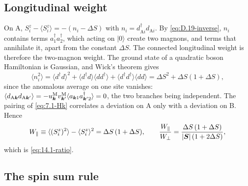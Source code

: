 \subsection*{Longitudinal weight}

On A, $S^z_i - \langle S^z_i\rangle = -(n_i - \Delta S)$ with $n_i = d^\dagger_{\mathrm{A}i}d_{\mathrm{A}i}$. By \cref{eq:D.19-inverse}, $n_i$ contains terms $a^\dagger_1a^\dagger_2$, which acting on $|0\rangle$ create two magnons, and terms that annihilate it, apart from the constant $\Delta S$. The connected longitudinal weight is therefore the two-magnon weight. The ground state of a quadratic boson Hamiltonian is Gaussian, and Wick's theorem gives
\begin{equation*}
  \langle n_i^2\rangle = \langle d^\dagger d\rangle^2 + \langle d^\dagger d\rangle\langle dd^\dagger\rangle + \langle d^\dagger d^\dagger\rangle\langle dd\rangle = \Delta S^2 + \Delta S(1 + \Delta S) ,
\end{equation*}
since the anomalous average on one site vanishes: $\langle d_{\mathrm{A}\bm{k}}d_{\mathrm{A}\bm{k}'}\rangle = -u^{\mathrm{M}}_{\bm{k}}v^{\mathrm{M}}_{\bm{k}'}\langle a_{\bm{k}1}a^\dagger_{\bm{k}'2}\rangle = 0$, the two branches being independent. The pairing of \cref{eq:7.1-Hk} correlates a deviation on A only with a deviation on B. Hence
\begin{equation}
  W_\parallel \equiv \langle(S^z_i)^2\rangle - \langle S^z_i\rangle^2 = \Delta S\,(1 + \Delta S), \qquad
  \frac{W_\parallel}{W_\perp} = \frac{\Delta S\,(1 + \Delta S)}{|\bm{S}|\,(1 + 2\Delta S)} ,
  \label{eq:D.38-Wpar}
\end{equation}
which is \cref{eq:14.1-ratio}.

\subsection*{The spin sum rule}

